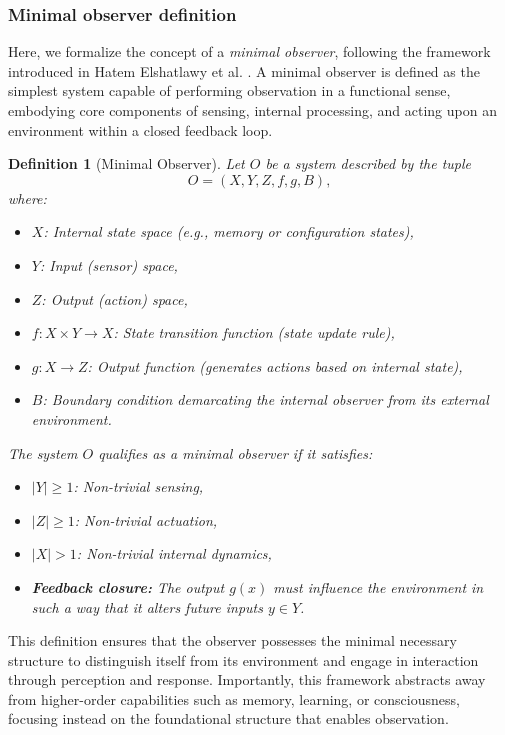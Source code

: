 \documentclass{ijuc}
\newtheorem{definition}{Definition}[section]
\begin{document}
\subsubsection{Minimal observer definition}
Here, we formalize the concept of a \emph{minimal observer}, following the framework introduced in Hatem Elshatlawy et al. \cite{elshatlawy2025towards}.
A minimal observer is defined as the simplest system capable of performing observation in a functional sense, embodying core components of sensing, internal processing, and acting upon an environment within a closed feedback loop.
\begin{definition}[Minimal Observer]
Let $O$ be a system described by the tuple
\[
O = (X, Y, Z, f, g, B),
\]
where:
\begin{itemize}
\item $X$: Internal state space (e.g., memory or configuration states),
\item $Y$: Input (sensor) space,
\item $Z$: Output (action) space,
\item $f: X \times Y \rightarrow X$: State transition function (state update rule),
\item $g: X \rightarrow Z$: Output function (generates actions based on internal state),
\item $B$: Boundary condition demarcating the internal observer from its external environment.
\end{itemize}
The system $O$ qualifies as a \emph{minimal observer} if it satisfies:
\begin{itemize}
\item $|Y| \geq 1$: Non-trivial sensing,
\item $|Z| \geq 1$: Non-trivial actuation,
\item $|X| > 1$: Non-trivial internal dynamics,
\item \textbf{Feedback closure:} The output $g(x)$ must influence the environment in such a way that it alters future inputs $y \in Y$.
\end{itemize}
\end{definition}
This definition ensures that the observer possesses the minimal necessary structure to distinguish itself from its environment and engage in interaction through perception and response.
Importantly, this framework abstracts away from higher-order capabilities such as memory, learning, or consciousness, focusing instead on the foundational structure that enables observation.
\end{document}
